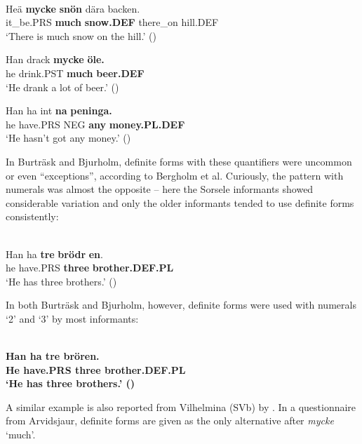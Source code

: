 \ea\label{}
\\
\gll Heä  \textbf{mycke} \textbf{snön} dära  backen.\\
it\_be.PRS  \textbf{much} \textbf{snow.DEF} there\_on  hill.DEF\\
\glt ‘There is much snow on the hill.’ (\citet[24]{BergholmEtAl1999})

\z

\ea
\gll Han  drack  \textbf{mycke} \textbf{öle.}\\
he  drink.PST  \textbf{much} \textbf{beer.DEF}\\
\glt ‘He drank a lot of beer.’ (\citet[24]{BergholmEtAl1999})

\z 

\ea
\gll Han  ha  int  \textbf{na} \textbf{peninga.}\\
he  have.PRS  NEG  \textbf{any} \textbf{money.PL.DEF}\\
\glt ‘He hasn’t got any money.’ (\citet[24]{BergholmEtAl1999})

\z

In Burträsk and Bjurholm, definite forms with these quantifiers were uncommon or even “exceptions”, according to Bergholm et al. Curiously, the pattern with numerals was almost the opposite – here the Sorsele informants showed considerable variation and only the older informants tended to use definite forms consistently:

\ea \label{} 
\\
\gll Han  ha  \textbf{tre} \textbf{brödr} \textbf{en}.\\
he  have.PRS  \textbf{three} \textbf{brother.DEF.PL}\\
\glt ‘He has three brothers.’ (\citet[24]{BergholmEtAl1999})

\z

In both Burträsk and Bjurholm, however, definite forms were used with numerals ‘2’ and ‘3’ by most informants:

\ea \label{} 
\\
\gll \bfseries Han  ha  tre  brören.\\
\bfseries He  have.PRS  three  brother.DEF.PL\\
\glt ‘He has three brothers.’ (\citet[24]{BergholmEtAl1999})

\z

A similar example is also reported from Vilhelmina (SVb) by \citet{WälchliEtAl1998}. In a questionnaire from Arvidsjaur, definite forms are given as the only alternative after \textit{mycke} ‘much’. 

